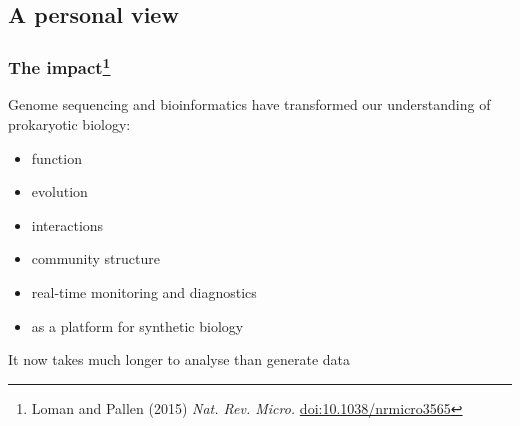 
\subsection{A personal view}

\begin{frame}
  \frametitle{The impact\footnote{\tiny{Loman and Pallen (2015) \textit{Nat. Rev. Micro.} \href{http://dx.doi.org/10.1038/nrmicro3565}{doi:10.1038/nrmicro3565}}}}
  Genome sequencing and bioinformatics have transformed our understanding of prokaryotic biology:
  \begin{itemize}
    \item function
    \item evolution
    \item interactions
    \item community structure
    \item real-time monitoring and diagnostics
    \item as a platform for synthetic biology
  \end{itemize}
  It now takes much longer to analyse than generate data
\end{frame}

